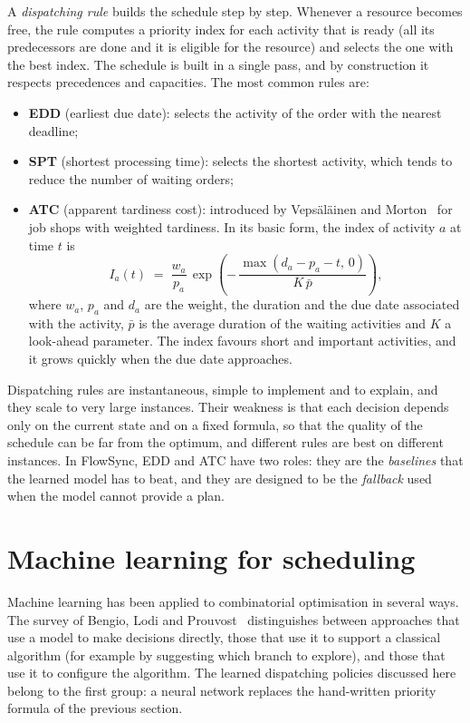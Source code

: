 A \emph{dispatching rule} builds the schedule step by step. Whenever a resource becomes free, the
rule computes a priority index for each activity that is ready (all its predecessors are done and
it is eligible for the resource) and selects the one with the best index. The schedule is built
in a single pass, and by construction it respects precedences and capacities. The most common
rules are:
\begin{itemize}
  \item \textbf{EDD} (earliest due date): selects the activity of the order with the nearest
        deadline;
  \item \textbf{SPT} (shortest processing time): selects the shortest activity, which tends to
        reduce the number of waiting orders;
  \item \textbf{ATC} (apparent tardiness cost): introduced by Vepsäläinen and
        Morton~\cite{vepsalainen1987} for job shops with weighted tardiness. In its basic form,
        the index of activity $a$ at time $t$ is
        \[
          I_a(t) \;=\; \frac{w_a}{p_a}\,\exp\!\left(-\,\frac{\max(d_a - p_a - t,\,0)}{K\,\bar p}\right),
        \]
        where $w_a$, $p_a$ and $d_a$ are the weight, the duration and the due date associated
        with the activity, $\bar p$ is the average duration of the waiting activities and $K$ a
        look-ahead parameter. The index favours short and important activities, and it grows
        quickly when the due date approaches.
\end{itemize}
Dispatching rules are instantaneous, simple to implement and to explain, and they scale to very
large instances. Their weakness is that each decision depends only on the current state and on a
fixed formula, so that the quality of the schedule can be far from the optimum, and different
rules are best on different instances. In FlowSync, EDD and ATC have two roles: they are the
\emph{baselines} that the learned model has to beat, and they are designed to be the
\emph{fallback} used when the model cannot provide a plan.

\section{Machine learning for scheduling}
\label{sec:ml-scheduling}

Machine learning has been applied to combinatorial optimisation in several ways. The survey of
Bengio, Lodi and Prouvost~\cite{bengio2021} distinguishes between approaches that use a model to
make decisions directly, those that use it to support a classical algorithm (for example by
suggesting which branch to explore), and those that use it to configure the algorithm. The
learned dispatching policies discussed here belong to the first group: a neural network replaces
the hand-written priority formula of the previous section.

